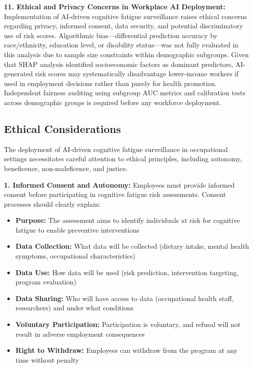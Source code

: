 \documentclass[journal,twoside,10pt]{IEEEtran}
\begin{document}
\textbf{11. Ethical and Privacy Concerns in Workplace AI Deployment:}
Implementation of AI-driven cognitive fatigue surveillance raises ethical concerns regarding privacy, informed consent, data security, and potential discriminatory use of risk scores. Algorithmic bias---differential prediction accuracy by race/ethnicity, education level, or disability status---was not fully evaluated in this analysis due to sample size constraints within demographic subgroups. Given that SHAP analysis identified socioeconomic factors as dominant predictors, AI-generated risk scores may systematically disadvantage lower-income workers if used in employment decisions rather than purely for health promotion. Independent fairness auditing using subgroup AUC metrics and calibration tests across demographic groups is required before any workforce deployment.

\subsection{Ethical Considerations}

The deployment of AI-driven cognitive fatigue surveillance in occupational settings necessitates careful attention to ethical principles, including autonomy, beneficence, non-maleficence, and justice.

\textbf{1. Informed Consent and Autonomy:}
Employees must provide informed consent before participating in cognitive fatigue risk assessments. Consent processes should clearly explain:
\begin{itemize}
\item \textbf{Purpose:} The assessment aims to identify individuals at risk for cognitive fatigue to enable preventive interventions
\item \textbf{Data Collection:} What data will be collected (dietary intake, mental health symptoms, occupational characteristics)
\item \textbf{Data Use:} How data will be used (risk prediction, intervention targeting, program evaluation)
\item \textbf{Data Sharing:} Who will have access to data (occupational health staff, researchers) and under what conditions
\item \textbf{Voluntary Participation:} Participation is voluntary, and refusal will not result in adverse employment consequences
\item \textbf{Right to Withdraw:} Employees can withdraw from the program at any time without penalty
\end{itemize}
\end{document}
